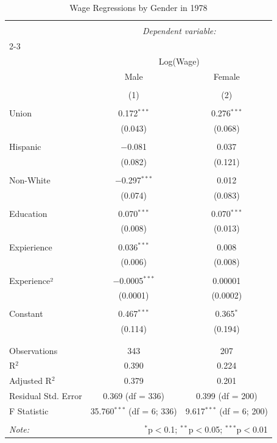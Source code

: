 
\begin{table}[!htbp] \centering 
  \caption{Wage Regressions by Gender in 1978} 
  \label{} 
\begin{tabular}{@{\extracolsep{5pt}}lcc} 
\\[-1.8ex]\hline 
\hline \\[-1.8ex] 
 & \multicolumn{2}{c}{\textit{Dependent variable:}} \\ 
\cline{2-3} 
\\[-1.8ex] & \multicolumn{2}{c}{Log(Wage)} \\ 
 & Male & Female \\ 
\\[-1.8ex] & (1) & (2)\\ 
\hline \\[-1.8ex] 
 Union & 0.172$^{***}$ & 0.276$^{***}$ \\ 
  & (0.043) & (0.068) \\ 
  & & \\ 
 Hispanic & $-$0.081 & 0.037 \\ 
  & (0.082) & (0.121) \\ 
  & & \\ 
 Non-White & $-$0.297$^{***}$ & 0.012 \\ 
  & (0.074) & (0.083) \\ 
  & & \\ 
 Education & 0.070$^{***}$ & 0.070$^{***}$ \\ 
  & (0.008) & (0.013) \\ 
  & & \\ 
 Expierience & 0.036$^{***}$ & 0.008 \\ 
  & (0.006) & (0.008) \\ 
  & & \\ 
 Experience² & $-$0.0005$^{***}$ & 0.00001 \\ 
  & (0.0001) & (0.0002) \\ 
  & & \\ 
 Constant & 0.467$^{***}$ & 0.365$^{*}$ \\ 
  & (0.114) & (0.194) \\ 
  & & \\ 
\hline \\[-1.8ex] 
Observations & 343 & 207 \\ 
R$^{2}$ & 0.390 & 0.224 \\ 
Adjusted R$^{2}$ & 0.379 & 0.201 \\ 
Residual Std. Error & 0.369 (df = 336) & 0.399 (df = 200) \\ 
F Statistic & 35.760$^{***}$ (df = 6; 336) & 9.617$^{***}$ (df = 6; 200) \\ 
\hline 
\hline \\[-1.8ex] 
\textit{Note:}  & \multicolumn{2}{r}{$^{*}$p$<$0.1; $^{**}$p$<$0.05; $^{***}$p$<$0.01} \\ 
\end{tabular} 
\end{table} 
